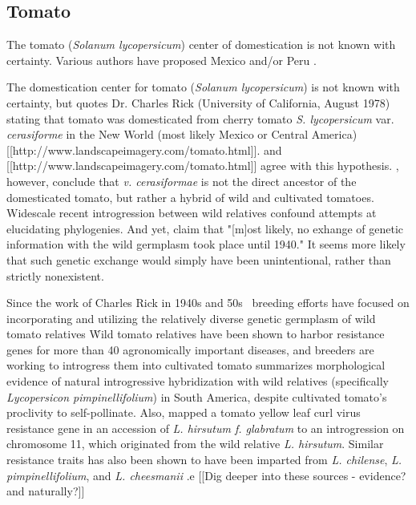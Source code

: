 \documentclass[11pt]{article}
\begin{document}
\subsection*{Tomato}

The tomato (\emph{Solanum lycopersicum}) center of domestication is not known with certainty.
Various authors have proposed Mexico and/or Peru \cite{robertson2007genetic}.



The domestication center for tomato (\emph{Solanum lycopersicum}) is not known with certainty, but \cite{sims1979history} quotes Dr. Charles Rick (University of California, August 1978) stating that tomato was domesticated from cherry tomato \emph{S. lycopersicum} var. \emph{cerasiforme} in the New World (most likely Mexico or Central America) [[http://www.landscapeimagery.com/tomato.html]].
\cite{robertson2007genetic, bai2007domestication} and [[http://www.landscapeimagery.com/tomato.html]] agree with this hypothesis.
\cite{nesbitt2002comparative}, however, conclude that \emph{v. cerasiformae} is not the direct ancestor of the domesticated tomato, but rather a hybrid of wild and cultivated tomatoes.
Widescale recent introgression between wild relatives confound attempts at elucidating phylogenies.
And yet, \cite{bai2007domestication} claim that "[m]ost likely, no exhange of genetic information with the wild germplasm took place until 1940."
It seems more likely that such genetic exchange would simply have been unintentional, rather than strictly nonexistent.

Since the work of Charles Rick in 1940s and 50s \cite{rick1953novel}\, breeding efforts have focused on incorporating and utilizing the relatively diverse genetic germplasm of wild tomato relatives \cite{rick1988tomato, miller1990rflp, rick1982potential}\.
Wild tomato relatives have been shown to harbor resistance genes for more than 40 agronomically important diseases, and breeders are working to introgress them into cultivated tomato \cite{rick1995utilization}\.
\cite{rick1958role} summarizes morphological evidence of natural introgressive hybridization with wild relatives (specifically \emph{Lycopersicon pimpinellifolium}) in South America, despite cultivated tomato's proclivity to self-pollinate.
Also, \cite{hanson2000mapping} mapped a tomato yellow leaf curl virus resistance gene in an accession of \emph{L. hirsutum f. glabratum} \cite{banerjee1990transfer} to an introgression on chromosome 11, which originated from the wild relative \emph{L. hirsutum}.
Similar resistance traits has also been shown to have been imparted from \emph{L. chilense}, \emph{L. pimpinellifolium}, and \emph{L. cheesmanii} \cite{hanson2000mapping}.e
[[Dig deeper into these sources - evidence?  and naturally?]]
\end{document}
